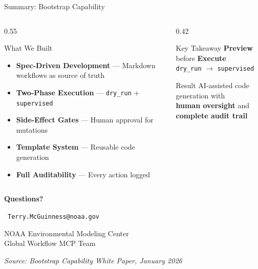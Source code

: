 \documentclass[aspectratio=169]{beamer}
\newcommand{\faEnvelope}{\Letter}
\begin{document}
\begin{frame}{Summary: Bootstrap Capability}
\begin{columns}[T]
\begin{column}{0.55\textwidth}
\begin{block}{What We Built}
\begin{itemize}
    \item \textbf{Spec-Driven Development} — Markdown workflows as source of truth
    \item \textbf{Two-Phase Execution} — \texttt{dry\_run} + \texttt{supervised}
    \item \textbf{Side-Effect Gates} — Human approval for mutations
    \item \textbf{Template System} — Reusable code generation
    \item \textbf{Full Auditability} — Every action logged
\end{itemize}
\end{block}
\end{column}

\begin{column}{0.42\textwidth}
\begin{alertblock}{Key Takeaway}
\centering
\Large
\textbf{Preview} before \textbf{Execute}\\[0.5em]
\normalsize
\texttt{dry\_run} $\rightarrow$ \texttt{supervised}
\end{alertblock}

\vspace{0.5em}

\begin{exampleblock}{Result}
AI-assisted code generation with\\
\textbf{human oversight} and\\
\textbf{complete audit trail}
\end{exampleblock}
\end{column}
\end{columns}
\end{frame}

\begin{frame}
\begin{center}
\Huge\textbf{Questions?}

\vspace{2em}

\Large
\faEnvelope\ \texttt{Terry.McGuinness@noaa.gov}

\vspace{1em}

\normalsize
NOAA Environmental Modeling Center\\
Global Workflow MCP Team

\vspace{2em}

\footnotesize
\textit{Source: Bootstrap Capability White Paper, January 2026}
\end{center}
\end{frame}
\end{document}
